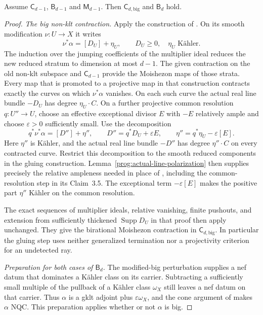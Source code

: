 \begin{lemma}
\label{prog:base-point-free-induction}
Assume $\mathsf C_{d-1}$, $\mathsf B_{d-1}$ and $\mathsf M_{d-1}$.
Then $\mathsf C_{d,\mathrm{big}}$ and $\mathsf B_d$ hold.
\end{lemma}
\begin{proof}
\smallskip\noindent
\emph{The big non-klt contraction.}
Apply the construction of \cite[Section~3]{HX}. On its smooth
modification $\nu:U\to X$ it writes
\[
 \nu^*\alpha=[D_U]+\eta_U,
 \qquad D_U\geq0,\quad \eta_U\text{ K\"ahler}.
\]
The induction over the jumping coefficients of the multiplier
ideal reduces the new reduced stratum to dimension at most $d-1$.
The given contraction on the old non-klt subspace and
$\mathsf C_{d-1}$ provide the Moishezon maps of those strata.
Every map that is promoted to a projective map in that construction
contracts exactly the curves on which $\nu^*\alpha$ vanishes.
On each such curve the actual real line bundle $-D_U$ has degree
$\eta_U\cdot C$. On a further projective common resolution
$q:U''\to U$, choose an effective exceptional divisor $E$ with
$-E$ relatively ample and choose $\varepsilon>0$ sufficiently small.
Use the decomposition
\[
 q^*\nu^*\alpha=[D'']+\eta'',\qquad
 D''=q^*D_U+\varepsilon E,\qquad
 \eta''=q^*\eta_U-\varepsilon[E].
\]
Here $\eta''$ is K\"ahler, and the actual real line bundle $-D''$
has degree $\eta''\cdot C$ on every contracted curve. Restrict this
decomposition to the smooth reduced components in the gluing
construction. Lemma~\ref{prog:actual-line-polarization} then supplies
precisely the relative ampleness needed in place of
\cite[Lemma~2.42]{HX}, including the common-resolution step in its
Claim~3.5. The exceptional term $-\varepsilon[E]$ makes the
positive part $\eta''$ K\"ahler on the common resolution.

The exact sequences of multiplier ideals, relative vanishing,
finite pushouts, and extension from sufficiently thickened
$\operatorname{Supp}D_U$ in that proof then apply unchanged.
They give the birational Moishezon contraction in
$\mathsf C_{d,\mathrm{big}}$. In particular the gluing step uses
neither generalized termination nor a projectivity criterion for
an undetected ray.

\smallskip\noindent
\emph{Preparation for both cases of $\mathsf B_d$.}
The modified-big perturbation
\cite[Lemma~2.23]{HX} supplies a nef datum that dominates a
K\"ahler class on its carrier. Subtracting a sufficiently small
multiple of the pullback of a K\"ahler class $\omega_X$ still leaves
a nef datum on that carrier. Thus
$\alpha$ is a gklt adjoint plus $\varepsilon\omega_X$, and the cone
argument of \cite[Lemma~2.45]{HX} makes $\alpha$ NQC.
This preparation applies whether or not $\alpha$ is big.


\end{proof}
